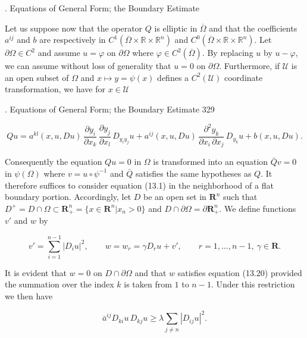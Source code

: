 \vspace{1em}

. Equations of General Form; the Boundary Estimate

Let us suppose now that the operator $Q$ is elliptic in $\overline{\Omega}$ and that the coefficients $a^{ij}$ and $b$ are respectively in $C^1(\overline{\Omega}\times\mathbb{R}\times\mathbb{R}^n)$ and $C^0(\overline{\Omega}\times\mathbb{R}\times\mathbb{R}^n)$. Let $\partial\Omega\in C^2$ and assume $u=\varphi$ on $\partial\Omega$ where $\varphi\in C^2(\overline{\Omega})$. By replacing $u$ by $u-\varphi$, we can assume without loss of generality that $u=0$ on $\partial\Omega$. Furthermore, if $\mathcal{U}$ is an open subset of $\Omega$ and $x\mapsto y=\psi(x)$ defines a $C^2(\mathcal{U})$ coordinate transformation, we have for $x\in\mathcal{U}$


\setcounter{section}{13}
\setcounter{subsection}{3}
. Equations of General Form; the Boundary Estimate \hfill 329

\begin{equation}\tag{13.32}
Qu=a^{kl}(x,u,Du)\,\frac{\partial y_i}{\partial x_k}\,\frac{\partial y_j}{\partial x_l}\,D_{y_i y_j}u
+a^{ij}(x,u,Du)\,\frac{\partial^2 y_k}{\partial x_i\,\partial x_j}\,D_{y_k}u
+b(x,u,Du).
\end{equation}

Consequently the equation $Qu=0$ in $\Omega$ is transformed into an equation $\bar{Q}v=0$
in $\psi(\Omega)$ where $v=u\circ\psi^{-1}$ and $\bar{Q}$ satisfies the same hypotheses as $Q$. It therefore
suffices to consider equation (13.1) in the neighborhood of a flat boundary
portion. Accordingly, let $D$ be an open set in $\mathbf{R}^n$ such that $D^+=D\cap\Omega\subset\mathbf{R}^n_+=
\{x\in\mathbf{R}^n|x_n>0\}$ and $D\cap\partial\Omega=\partial\mathbf{R}^n_+$. We define functions $v'$ and $w$ by

\begin{equation}\tag{13.33}
v'=\sum_{i=1}^{n-1}|D_i u|^2,\qquad w=w_r=\gamma D_r u+v',\qquad r=1,\ldots,n-1,\ \gamma\in\mathbf{R}.
\end{equation}

It is evident that $w=0$ on $D\cap\partial\Omega$ and that $w$ satisfies equation (13.20) provided
the summation over the index $k$ is taken from $1$ to $n-1$. Under this restriction we
then have

\[
\bar{a}^{ij}D_{ki}u\,D_{kj}u\geq \lambda \sum_{j\neq n}|D_{ij}u|^2.
\]

